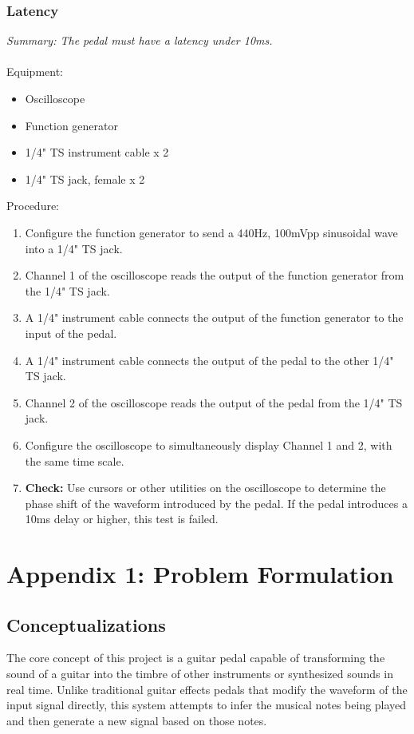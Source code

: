 \documentclass[12pt]{article}
\begin{document}
\subsubsection{Latency}
\textit{Summary: The pedal must have a latency under 10ms.}\\\\
Equipment:
\begin{itemize}
    \item Oscilloscope
    \item Function generator
    \item 1/4" TS instrument cable x 2
    \item 1/4" TS jack, female x 2
\end{itemize}
Procedure:
\begin{enumerate}
    \item Configure the function generator to send a 440Hz, 100mVpp sinusoidal wave into a 1/4" TS jack.
    \item Channel 1 of the oscilloscope reads the output of the function generator from the 1/4" TS jack.
    \item A 1/4" instrument cable connects the output of the function generator to the input of the pedal.
    \item A 1/4" instrument cable connects the output of the pedal to the other 1/4" TS jack.
    \item Channel 2 of the oscilloscope reads the output of the pedal from the 1/4" TS jack.
    \item Configure the oscilloscope to simultaneously display Channel 1 and 2, with the same time scale.
    \item \textbf{Check:} Use cursors or other utilities on the oscilloscope to determine the phase shift of the waveform introduced by the pedal. If the pedal introduces a 10ms delay or higher, this test is failed.
\end{enumerate}

\section*{Appendix 1: Problem Formulation}
\subsection*{Conceptualizations}
The core concept of this project is a guitar pedal capable of transforming the sound of a guitar into the timbre of other instruments or synthesized sounds in real time. Unlike traditional guitar effects pedals that modify the waveform of the input signal directly, this system attempts to infer the musical notes being played and then generate a new signal based on those notes.
\end{document}
